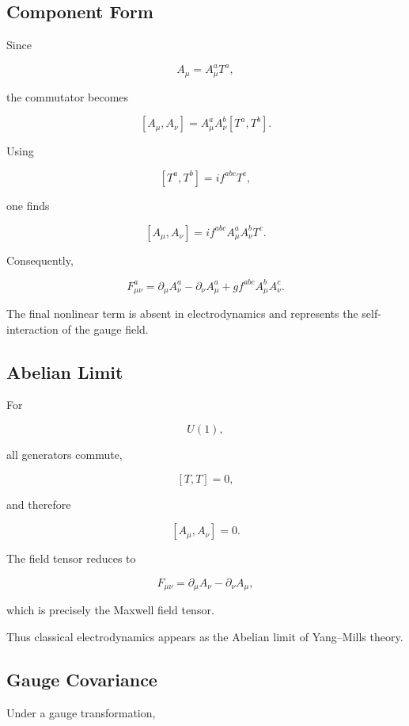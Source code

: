 \subsection{Component Form}

Since

\[
A_\mu
=
A_\mu^aT^a,
\]

the commutator becomes

\[
[A_\mu,A_\nu]
=
A_\mu^aA_\nu^b
[T^a,T^b].
\]

Using

\[
[T^a,T^b]
=
if^{abc}T^c,
\]

one finds

\[
[A_\mu,A_\nu]
=
if^{abc}
A_\mu^a
A_\nu^b
T^c.
\]

Consequently,

\[
\boxed{
F_{\mu\nu}^a
=
\partial_\mu A_\nu^a
-
\partial_\nu A_\mu^a
+
gf^{abc}
A_\mu^bA_\nu^c.
}
\]

The final nonlinear term is absent in electrodynamics and represents the
self-interaction of the gauge field.


\subsection{Abelian Limit}

For

\[
U(1),
\]

all generators commute,

\[
[T,T]=0,
\]

and therefore

\[
[A_\mu,A_\nu]=0.
\]

The field tensor reduces to

\[
\boxed{
F_{\mu\nu}
=
\partial_\mu A_\nu
-
\partial_\nu A_\mu,
}
\]

which is precisely the Maxwell field tensor.

Thus classical electrodynamics appears as the Abelian limit of
Yang--Mills theory.


\subsection{Gauge Covariance}

Under a gauge transformation,

